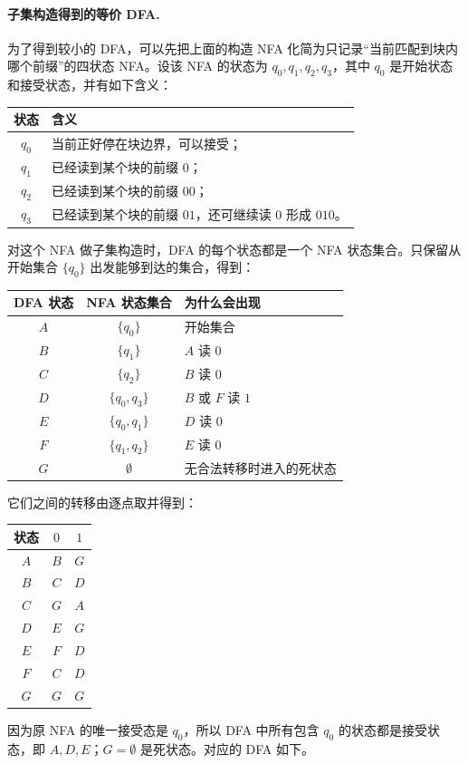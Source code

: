 \begin{answerred}
\paragraph{子集构造得到的等价 DFA.}
为了得到较小的 DFA，可以先把上面的构造 NFA 化简为只记录“当前匹配到块内哪个前缀”的四状态 NFA。设该 NFA 的状态为 $q_0,q_1,q_2,q_3$，其中 $q_0$ 是开始状态和接受状态，并有如下含义：
\begin{center}
\begin{tabular}{c|l}
状态 & 含义 \\
\hline
$q_0$ & 当前正好停在块边界，可以接受；\\
$q_1$ & 已经读到某个块的前缀 $0$；\\
$q_2$ & 已经读到某个块的前缀 $00$；\\
$q_3$ & 已经读到某个块的前缀 $01$，还可继续读 $0$ 形成 $010$。
\end{tabular}
\end{center}

对这个 NFA 做子集构造时，DFA 的每个状态都是一个 NFA 状态集合。只保留从开始集合 $\{q_0\}$ 出发能够到达的集合，得到：
\begin{center}
\begin{tabular}{c|c|l}
DFA 状态 & NFA 状态集合 & 为什么会出现 \\
\hline
$A$ & $\{q_0\}$ & 开始集合\\
$B$ & $\{q_1\}$ & $A$ 读 $0$\\
$C$ & $\{q_2\}$ & $B$ 读 $0$\\
$D$ & $\{q_0,q_3\}$ & $B$ 或 $F$ 读 $1$\\
$E$ & $\{q_0,q_1\}$ & $D$ 读 $0$\\
$F$ & $\{q_1,q_2\}$ & $E$ 读 $0$\\
$G$ & $\emptyset$ & 无合法转移时进入的死状态
\end{tabular}
\end{center}

它们之间的转移由逐点取并得到：
\begin{center}
\begin{tabular}{c|cc}
状态 & $0$ & $1$ \\
\hline
$A$ & $B$ & $G$ \\
$B$ & $C$ & $D$ \\
$C$ & $G$ & $A$ \\
$D$ & $E$ & $G$ \\
$E$ & $F$ & $D$ \\
$F$ & $C$ & $D$ \\
$G$ & $G$ & $G$
\end{tabular}
\end{center}
因为原 NFA 的唯一接受态是 $q_0$，所以 DFA 中所有包含 $q_0$ 的状态都是接受状态，即 $A,D,E$；$G=\emptyset$ 是死状态。对应的 DFA 如下。


\end{answerred}
